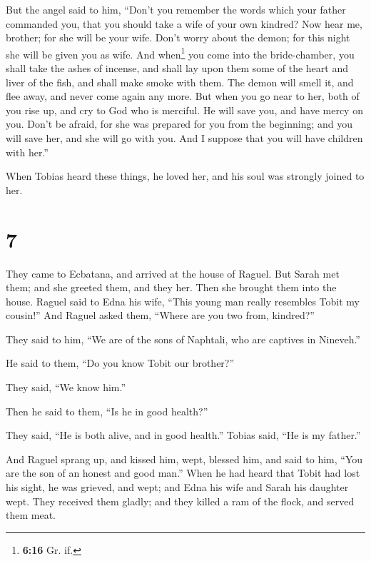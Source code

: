  But the angel said to him, ``Don't you remember the
words which your father commanded you, that you should take a wife of
your own kindred? Now hear me, brother; for she will be your wife. Don't
worry about the demon; for this night she will be given you as wife.
 And when\footnote{\textbf{6:16} Gr. if.} you come into
the bride-chamber, you shall take the ashes of incense, and shall lay
upon them some of the heart and liver of the fish, and shall make smoke
with them.  The demon will smell it, and flee away, and
never come again any more. But when you go near to her, both of you rise
up, and cry to God who is merciful. He will save you, and have mercy on
you. Don't be afraid, for she was prepared for you from the beginning;
and you will save her, and she will go with you. And I suppose that you
will have children with her.''

When Tobias heard these things, he loved her, and his soul was strongly
joined to her.

\hypertarget{section-6}{%
\section{7}\label{section-6}}

 They came to Ecbatana, and arrived at the house of
Raguel. But Sarah met them; and she greeted them, and they her. Then she
brought them into the house.  Raguel said to Edna his
wife, ``This young man really resembles Tobit my cousin!''
 And Raguel asked them, ``Where are you two from,
kindred?''

They said to him, ``We are of the sons of Naphtali, who are captives in
Nineveh.''

 He said to them, ``Do you know Tobit our brother?''

They said, ``We know him.''

Then he said to them, ``Is he in good health?''

 They said, ``He is both alive, and in good health.''
Tobias said, ``He is my father.''

 And Raguel sprang up, and kissed him, wept,
 blessed him, and said to him, ``You are the son of an
honest and good man.'' When he had heard that Tobit had lost his sight,
he was grieved, and wept;  and Edna his wife and Sarah his
daughter wept. They received them gladly; and they killed a ram of the
flock, and served them meat.

